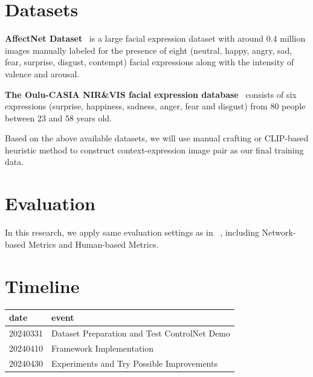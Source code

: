 





\section{Datasets}
\vspace{-2mm}
\textbf{AffectNet Dataset}~\cite{Gera_2021} is a large facial expression dataset with around 0.4 million images manually labeled for the presence of eight (neutral, happy, angry, sad, fear, surprise, disgust, contempt) facial expressions along with the intensity of valence and arousal.

\textbf{The Oulu-CASIA NIR\&VIS facial expression database}~\cite{4761697} consists of six expressions (surprise, happiness, sadness, anger, fear and disgust) from 80 people between 23 and 58 years old.

Based on the above available datasets, we will use manual crafting or CLIP-based heuristic method to construct context-expression image pair as our final training data.

\section{Evaluation}
\vspace{-2mm}
In this research, we apply same evaluation settings as in ~\cite{zhang2023adding}, including Network-based Metrics and Human-based Metrics.

\section{Timeline}

\noindent\begin{tabular}{|m{3cm}|m{12cm}|}
\hline
\textbf{date} & \textbf{event} \\
\hline
20240331 & Dataset Preparation and Test ControlNet Demo \\
\hline
20240410 & Framework Implementation \\
\hline
20240430 & Experiments and Try Possible Improvements \\
\hline
\end{tabular}